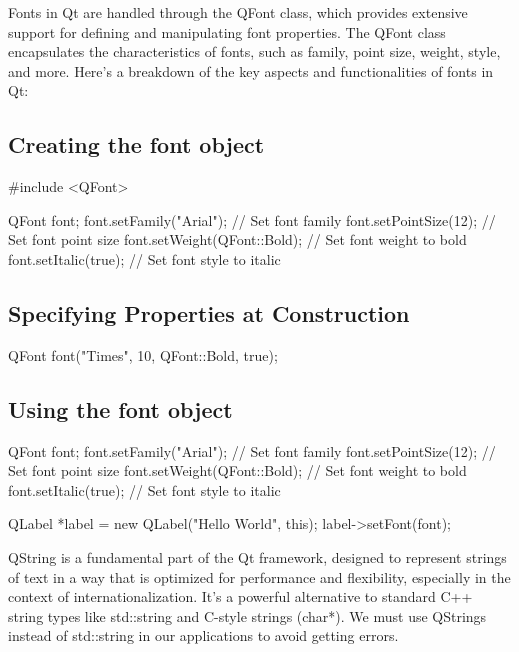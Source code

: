 \documentclass{report}
\begin{document}
    \pagebreak 
    \bigbreak \noindent 
    \begin{concept}
        Fonts in Qt are handled through the QFont class, which provides extensive support for defining and manipulating font properties. The QFont class encapsulates the characteristics of fonts, such as family, point size, weight, style, and more. Here's a breakdown of the key aspects and functionalities of fonts in Qt:
    \end{concept}
    \bigbreak \noindent 
    \subsection{Creating the font object}
    \bigbreak \noindent 
    \begin{cppcode}
    #include <QFont>

    QFont font;
    font.setFamily("Arial");      // Set font family
    font.setPointSize(12);        // Set font point size
    font.setWeight(QFont::Bold);  // Set font weight to bold
    font.setItalic(true);         // Set font style to italic
    \end{cppcode}

    \bigbreak \noindent 
    \subsection{Specifying Properties at Construction}
    \bigbreak \noindent 
    \begin{cppcode}
    QFont font("Times", 10, QFont::Bold, true);
    \end{cppcode}

    \bigbreak \noindent 
    \subsection{Using the font object}
    \bigbreak \noindent 
    \begin{cppcode}
    QFont font;
    font.setFamily("Arial");      // Set font family
    font.setPointSize(12);        // Set font point size
    font.setWeight(QFont::Bold);  // Set font weight to bold
    font.setItalic(true);         // Set font style to italic

    QLabel *label = new QLabel("Hello World", this);
    label->setFont(font);
    \end{cppcode}






    \pagebreak 
    \bigbreak \noindent 
    QString is a fundamental part of the Qt framework, designed to represent strings of text in a way that is optimized for performance and flexibility, especially in the context of internationalization. It's a powerful alternative to standard C++ string types like std::string and C-style strings (char*).
    \bigbreak \noindent 
    We must use QStrings instead of std::string in our applications to avoid getting errors.
    \bigbreak \noindent 
\end{document}
